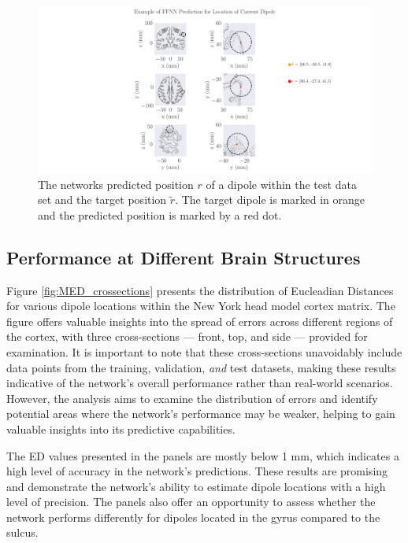 \documentclass[a4paper, UKenglish, 11pt]{uiomaster}
\begin{document}
\begin{figure}
  \hspace*{-10cm}
  \includegraphics[width=28cm]{figures/FFNN_single_dipole_prediction.pdf}
  \caption{The networks predicted position $r$ of a dipole within the test data set and the target position $\tilde{r}$. The target dipole is marked in orange and the predicted position is marked by a red dot.}
  \label{fig:prediction_FFNN_example}
\end{figure}

\subsection{Performance at Different Brain Structures}

Figure \ref{fig:MED_crossections} presents the distribution of Eucleadian Distances for various dipole locations within the New York head model cortex matrix. The figure offers valuable insights into the spread of errors across different regions of the cortex, with three cross-sections — front, top, and side — provided for examination. It is important to note that these cross-sections unavoidably include data points from the training, validation, \emph{and} test datasets, making these results indicative of the network's overall performance rather than real-world scenarios. However, the analysis aims to examine the distribution of errors and identify potential areas where the network's performance may be weaker, helping to gain valuable insights into its predictive capabilities.

The ED values presented in the panels are mostly below 1 mm, which indicates a high level of accuracy in the network's predictions. These results are promising and demonstrate the network's ability to estimate dipole locations with a high level of precision. The panels also offer an opportunity to assess whether the network performs differently for dipoles located in the gyrus compared to the sulcus.
\end{document}
